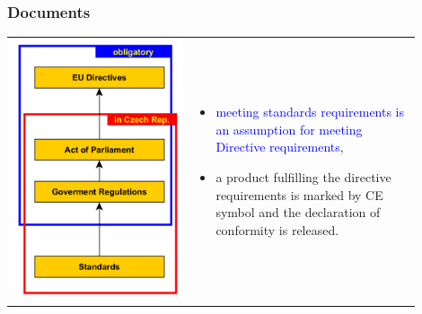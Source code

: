 \documentclass{beamer}
\begin{document}
	\begin{frame}
    \frametitle{Documents}
		\small
		\begin{center}
			\begin{tabular}{m{0.4\linewidth} m{0.5\linewidth}}
			\includegraphics[scale=0.25]{obr02_dokumenty.png} &
			
			\begin{itemize}
				\item \textcolor{blue}{meeting standards requirements is an assumption for meeting Directive requirements},
				\item a product fulfilling the directive requirements is marked by CE symbol and the declaration of conformity is released.
			\end{itemize}
			\end{tabular}
		\end{center}
	\end{frame}
\end{document}
